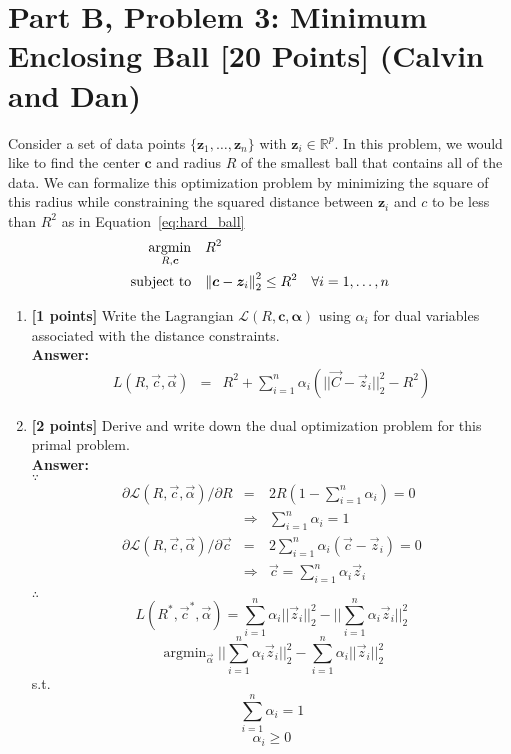 \documentclass{article}
\DeclareMathOperator*{\argmin}{\mathrm{argmin}}
\def\R{\mathbb{R}}
\newcommand{\st}{\mathop{\mathrm{subject\,\,to}}}
\begin{document}
\newpage


\section*{Part B, Problem 3: Minimum Enclosing Ball [20 Points] (Calvin and Dan)}

Consider a set of data points $\{\boldsymbol{z}_1,\dotsc,\boldsymbol{z}_n\}$ with $\boldsymbol{z}_i \in \R^p$. In this problem, we would like to find the center $\boldsymbol{c}$ and radius $R$ of the smallest ball that contains all of the data. We can formalize this optimization problem by minimizing the square of this radius while constraining the squared distance between $\boldsymbol{z}_i$ and $c$ to be less than $R^2$ as in Equation~\ref{eq:hard_ball}
\begin{align}
\argmin_{R,\boldsymbol{c}}&\quad R^{2} \nonumber \\ \st&\quad\norm{\boldsymbol{c}-\boldsymbol{z}_{i}}_{2}^{2}\leq R^{2}\quad \forall i=1,\dotsc,n \label{eq:hard_ball} 
\end{align}
\begin{enumerate}
\item \textbf{[1 points]} Write the Lagrangian $\mathcal{L}(R, \boldsymbol{c}, \boldsymbol{\alpha})$ using $\alpha_i$ for dual variables associated with the distance constraints.\\
\textbf{Answer:}\\
\begin{equation}
\nonumber
\begin{array}{rcl}
L(R,\vec{c},\vec{\alpha}) & = & R^2 + \sum_{i=1}^n\alpha_i(||\vec{C}-\vec{z}_i||_2^2-R^2)
\end{array}
\end{equation}

\item \textbf{[2 points]} Derive and write down the dual optimization problem for this primal problem.\\
\textbf{Answer:}\\
$\because$
\begin{equation}
\nonumber
\begin{array}{rcl}
\partial \mathcal{L}(R,\vec{c},\vec{\alpha}) / \partial R & = & 2R(1 - \sum_{i=1}^n\alpha_i) = 0 \\
			& \Rightarrow & \sum_{i=1}^n\alpha_i=1 \\
\partial \mathcal{L}(R,\vec{c},\vec{\alpha}) / \partial \vec{c} & = & 2\sum_{i=1}^n\alpha_i(\vec{c}-\vec{z}_i) = 0 \\
			& \Rightarrow & \vec{c}=\sum_{i=1}^n\alpha_i\vec{z}_i \\
\end{array}
\end{equation}
$\therefore$
$$L(R^*,\vec{c}^*,\vec{\alpha}) = \sum_{i=1}^n \alpha_i||\vec{z}_i||_2^2 - ||\sum_{i=1}^n\alpha_i\vec{z}_i||_2^2$$
$$\argmin_{\vec{\alpha}} ||\sum_{i=1}^n\alpha_i\vec{z}_i||_2^2 - \sum_{i=1}^n \alpha_i||\vec{z}_i||_2^2$$
s.t.
$$\sum_{i=1}^n\alpha_i=1$$
$$\alpha_i \geq 0$$

\end{enumerate}
 
\end{document}
